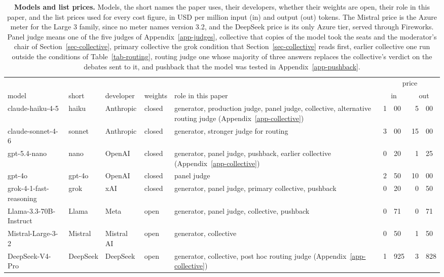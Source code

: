 \begin{table}[t]
\centering
\footnotesize
\caption{\textbf{Models and list prices.} Models, the short names the paper uses, their developers, whether
their weights are open, their role in this paper, and the list prices used for
every cost figure, in USD per million input (in) and output (out) tokens. The Mistral price is the Azure meter for the Large 3
family, since no meter names version 3.2, and the DeepSeek price is its only
Azure tier, served through Fireworks. Panel judge means one of the five
judges of Appendix~\ref{app-judges}, collective that copies of the model took
the seats and the moderator's chair of Section~\ref{sec-collective}, primary
collective the grok condition that Section~\ref{sec-collective} reads first,
earlier collective one run outside the conditions of
Table~\ref{tab-routing}, routing judge one whose majority of three answers
replaces the collective's verdict on the debates sent to it, and pushback
that the model was tested in Appendix~\ref{app-pushback}.}
\label{tab-app-models}
{\setlength{\tabcolsep}{4pt}\begin{tabular}{llll>{\raggedright\arraybackslash}p{3.8cm}r@{.}lr@{.}l}
\toprule
 & & & & & \multicolumn{4}{c}{price} \\
\cmidrule(l){6-9}
model & short & developer & weights & role in this paper & \multicolumn{2}{c}{in} & \multicolumn{2}{c}{out} \\
\midrule
claude-haiku-4-5 & haiku & Anthropic & closed & generator, production judge, panel judge, collective, alternative routing judge (Appendix~\ref{app-collective}) & 1&00 & 5&00 \\[2pt]
claude-sonnet-4-6 & sonnet & Anthropic & closed & generator, stronger judge for routing & 3&00 & 15&00 \\[2pt]
gpt-5.4-nano & nano & OpenAI & closed & generator, panel judge, pushback, earlier collective (Appendix~\ref{app-collective}) & 0&20 & 1&25 \\[2pt]
gpt-4o & gpt-4o & OpenAI & closed & panel judge & 2&50 & 10&00 \\[2pt]
grok-4-1-fast-reasoning & grok & xAI & closed & generator, panel judge, primary collective, pushback & 0&20 & 0&50 \\[2pt]
Llama-3.3-70B-Instruct & Llama & Meta & open & generator, panel judge, collective, pushback & 0&71 & 0&71 \\[2pt]
Mistral-Large-3-2 & Mistral & Mistral AI & open & generator, collective & 0&50 & 1&50 \\[2pt]
DeepSeek-V4-Pro & DeepSeek & DeepSeek & open & generator, collective, post hoc routing judge (Appendix~\ref{app-collective}) & 1&925 & 3&828 \\
\bottomrule
\end{tabular}}
\end{table}

